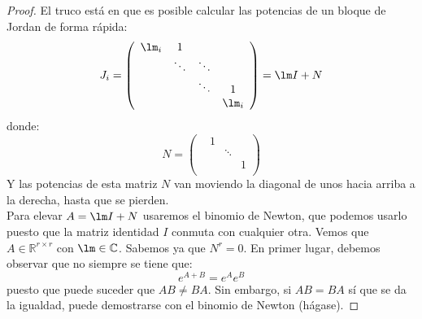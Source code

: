 \begin{proof}
    \noindent
    El truco está en que es posible calcular las potencias de un bloque de Jordan de forma rápida:
    \begin{equation*}
        J_i = \left(\begin{array}{cccc}
            \lm_i & 1 &  &  \\
             & \ddots & \ddots &  \\
             &  & \ddots & 1 \\
             &  &  &  \lm_i
        \end{array}\right) = \lm I + N
    \end{equation*}
    donde:
    \begin{equation*}
        N = \left(\begin{array}{cccc}
             &1  &  &  \\
             &  & \ddots &  \\
             &  &  & 1 \\
             &  &  &  
        \end{array}\right)
    \end{equation*}
    Y las potencias de esta matriz $N$ van moviendo la diagonal de unos hacia arriba a la derecha, hasta que se pierden. \\


    \noindent
    Para elevar $A = \lm I + N$ usaremos el binomio de Newton, que podemos usarlo puesto que la matriz identidad $I$ conmuta con cualquier otra. Vemos que $A\in \mathbb{R}^{r\times r}$ con $\lm\in \mathbb{C}$. Sabemos ya que $N^r = 0$. En primer lugar, debemos observar que no siempre se tiene que:
    \begin{equation*}
        e^{A+B} = e^Ae^B
    \end{equation*}
    puesto que puede suceder que $AB\neq BA$. Sin embargo, si $AB = BA$ sí que se da la igualdad, puede demostrarse con el binomio de Newton (hágase). %
\end{proof}



